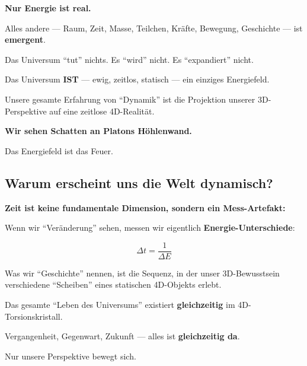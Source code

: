 	\begin{philosophical}
		\textbf{Nur Energie ist real.}

		\vspace{0.3cm}

		Alles andere — Raum, Zeit, Masse, Teilchen, Kräfte, Bewegung, Geschichte — ist \textbf{emergent}.

		\vspace{0.3cm}

		Das Universum \enquote{tut} nichts. Es \enquote{wird} nicht. Es \enquote{expandiert} nicht.

		\vspace{0.3cm}

		Das Universum \textbf{IST} — ewig, zeitlos, statisch — ein einziges Energiefeld.

		\vspace{0.3cm}

		Unsere gesamte Erfahrung von \enquote{Dynamik} ist die Projektion unserer 3D-Perspektive auf eine zeitlose 4D-Realität.

		\vspace{0.3cm}

		\textbf{Wir sehen Schatten an Platons Höhlenwand.}

		\vspace{0.3cm}

		Das Energiefeld ist das Feuer.
	\end{philosophical}

	\subsection{Warum erscheint uns die Welt dynamisch?}

	\begin{important}
		\textbf{Zeit ist keine fundamentale Dimension, sondern ein Mess-Artefakt:}

		\vspace{0.3cm}

		Wenn wir \enquote{Veränderung} sehen, messen wir eigentlich \textbf{Energie-Unterschiede}:

		\begin{equation}
			\Delta t = \frac{1}{\Delta E}
		\end{equation}

		\vspace{0.3cm}

		Was wir \enquote{Geschichte} nennen, ist die Sequenz, in der unser 3D-Bewusstsein verschiedene \enquote{Scheiben} eines statischen 4D-Objekts erlebt.

		\vspace{0.3cm}

		Das gesamte \enquote{Leben des Universums} existiert \textbf{gleichzeitig} im 4D-Torsionskristall.

		\vspace{0.3cm}

		Vergangenheit, Gegenwart, Zukunft — alles ist \textbf{gleichzeitig da}.

		Nur unsere Perspektive bewegt sich.
	\end{important}


